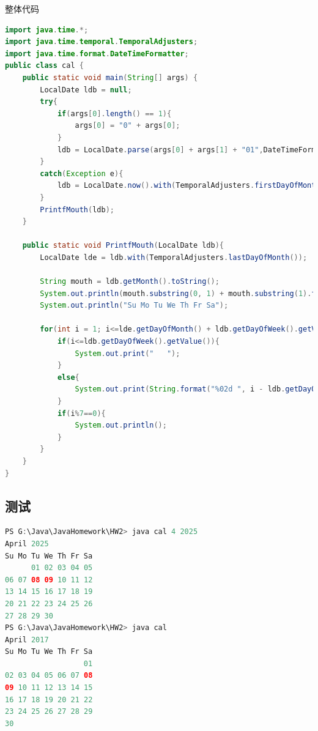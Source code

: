 \documentclass[a4paper]{article}
\begin{document}
整体代码

\begin{lstlisting}[language=Java]
import java.time.*;
import java.time.temporal.TemporalAdjusters;
import java.time.format.DateTimeFormatter;
public class cal {
    public static void main(String[] args) {
        LocalDate ldb = null;
        try{
            if(args[0].length() == 1){
                args[0] = "0" + args[0];
            }
            ldb = LocalDate.parse(args[0] + args[1] + "01",DateTimeFormatter.ofPattern("MMyyyydd"));
        }
        catch(Exception e){
            ldb = LocalDate.now().with(TemporalAdjusters.firstDayOfMonth());
        }
        PrintfMouth(ldb);
    }

    public static void PrintfMouth(LocalDate ldb){
        LocalDate lde = ldb.with(TemporalAdjusters.lastDayOfMonth());
        
        String mouth = ldb.getMonth().toString();
        System.out.println(mouth.substring(0, 1) + mouth.substring(1).toLowerCase() + " " + Integer.toString(ldb.getYear()));
        System.out.println("Su Mo Tu We Th Fr Sa");

        for(int i = 1; i<=lde.getDayOfMonth() + ldb.getDayOfWeek().getValue(); i++){
            if(i<=ldb.getDayOfWeek().getValue()){
                System.out.print("   ");
            }
            else{
                System.out.print(String.format("%02d ", i - ldb.getDayOfWeek().getValue()));
            }
            if(i%7==0){
                System.out.println();
            }
        }
    }
}
\end{lstlisting}

\subsection{测试}
\begin{lstlisting}[language=Java,numbers=none]
PS G:\Java\JavaHomework\HW2> java cal 4 2025
April 2025
Su Mo Tu We Th Fr Sa
      01 02 03 04 05
06 07 08 09 10 11 12
13 14 15 16 17 18 19
20 21 22 23 24 25 26
27 28 29 30
PS G:\Java\JavaHomework\HW2> java cal
April 2017
Su Mo Tu We Th Fr Sa
                  01
02 03 04 05 06 07 08
09 10 11 12 13 14 15
16 17 18 19 20 21 22
23 24 25 26 27 28 29
30
\end{lstlisting}
\end{document}
